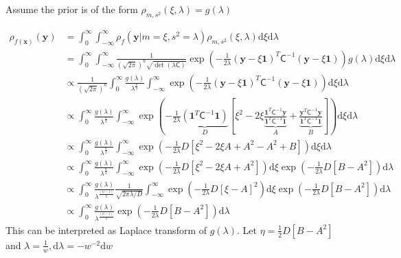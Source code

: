 \documentclass{iitthesis}          %
\newcommand{\bm}[1]{\boldsymbol{#1}}
\newcommand{\dif}[1]{\text{d}{#1}}
\newcommand{\vx}{\bm{x}}
\newcommand{\vy}{\bm{y}}
\newcommand{\vone}{\bm{1}}
\newcommand{\mC}{\mathsf{C}}
\newcommand{\mCInv}{{\mathsf{C}^{-1}}}
\begin{document}
{{{{{{




Assume the prior is of the form $ \rho_{m,s^2} (\xi, \lambda) = g(\lambda) $ 

\begin{align*}
\rho_{f(\vx)}(\vy) &=\int_{0}^\infty \int_{-\infty}^\infty \rho_{f} (\vy | m=\xi, s^2=\lambda) 
\rho_{m,s^2} (\xi, \lambda) \dif{\xi} \dif{\lambda} 
\\
&= \int_{0}^\infty \int_{-\infty}^\infty \frac{1}{(\sqrt{2 \pi})^n \sqrt{\det(\lambda \mC)}} 
\exp \left( -\frac{1}{2\lambda} (\vy - \xi \vone)^T\mCInv (\vy- \xi\vone)\right) g(\lambda) \dif{\xi} \dif{\lambda}
\\
& \propto \frac{1}{(\sqrt{2 \pi})^n} \int_{0}^\infty \frac{g(\lambda)}{\lambda ^{\frac n2} } 
\int_{-\infty}^\infty \exp \left( -\frac{1}{2\lambda} (\vy - \xi \vone)^T\mCInv (\vy- \xi\vone)\right)  \dif{\xi} \dif{\lambda}
\\
& \propto \int_{0}^\infty \frac{g(\lambda)}{\lambda^{\frac n2 }}
\int_{-\infty}^\infty \exp \left( -\frac{1}{2\lambda} 
\underbrace{(\vone^T \mCInv \vone)}_{D}
\left[
\xi^2 -2 \xi \underbrace{\frac{\vone^T \mCInv \vy }{\vone^T \mCInv \vone}}_{A} + \underbrace{\frac{\vy^T \mCInv \vy }{\vone^T \mCInv \vone}}_{B} 
\right]
\right)  \dif{\xi} \dif{\lambda}
\\
& \propto \int_{0}^\infty \frac{g(\lambda)}{\lambda^{\frac n2}}
\int_{-\infty}^\infty \exp \left( -\frac{1}{2\lambda} D
\left[
\xi^2 -2 \xi A + A^2 - A^2 + B
\right]
\right)  \dif{\xi} \dif{\lambda}
\\
& \propto \int_{0}^\infty \frac{g(\lambda)}{\lambda^{\frac n2}}
\int_{-\infty}^\infty \exp \left( -\frac{1}{2\lambda} D
\left[
\xi^2 -2 \xi A + A^2
\right]
\right) \dif{\xi}
\exp \left(  - \frac{1}{2\lambda} D [B - A^2] \right)
\dif{\lambda}
\\
& \propto \int_{0}^\infty \frac{g(\lambda)}{\lambda^{\frac{(n-1)}{2}}}
\frac{1}{\sqrt{2\pi\lambda/D}}
\int_{-\infty}^\infty \exp \left( -\frac{1}{2\lambda} D
\left[
\xi-A
\right]^2
\right) \dif{\xi}
\exp \left(  - \frac{1}{2\lambda} D [B - A^2] \right)
\dif{\lambda}
\\
& \propto \int_{0}^\infty \frac{g(\lambda)}{\lambda^{\frac{(n-1)}{2}}}
\exp \left(  - \frac{1}{2\lambda} D [B - A^2] \right)
\dif{\lambda}
\end{align*}
This can be interpreted as Laplace transform of $g(\lambda)$.
Let $\eta = \frac{1}{2} D [B - A^2] $ and $\lambda = \frac{1}{w}, \dif{\lambda} = -w^{-2} \dif{w}$ 
}}}}}}
\end{document}

